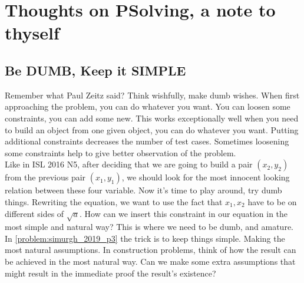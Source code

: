 \chapter{Thoughts on PSolving, a note to thyself}
\thispagestyle{empty}
\section{Be DUMB, Keep it SIMPLE} 

Remember what Paul Zeitz said? Think wishfully, make dumb wishes. When first approaching the problem, you can do whatever you want. You can loosen some constraints, you can add some new. This works exceptionally well when you need to build an object from one given object, you can do whatever you want. Putting additional constraints decreases the number of test cases. Sometimes loosening some constraints help to give better observation of the problem. \\


Like in ISL 2016 N5, after deciding that we are going to build a pair $ (x_2, y_2) $ from the previous pair $ (x_1, y_1) $, we should look for the most innocent looking relation between these four variable. Now it's time to play around, try dumb things. Rewriting the equation, we want to use the fact that $ x_1, x_2 $ have to be on different sides of $ \sqrt{a} $. How can we insert this constraint in our equation in the most simple and natural way? This is where we need to be dumb, and amature.\\


In \autoref{problem:simurgh_2019_p3} the trick is to keep things simple. Making the most natural assumptions. In construction problems, think of how the result can be achieved in the most natural way. Can we make some extra assumptions that might result in the immediate proof the result's existence? 
